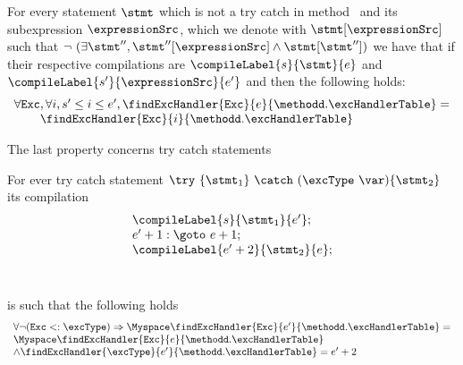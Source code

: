 \begin{compProp9}\label{compile:prop:compProp9}
  For every statement $\stmt$ which is not a try catch  in method \methodd \  and  its subexpression $\expressionSrc$, which we
 denote with $\stmt[\expressionSrc]$   
 such that $\neg \ ( \exists \stmt'', \stmt''[\expressionSrc] \wedge \stmt[\stmt'']  ) $ we have that 
if their respective compilations are  $\compileLabel{s}{\stmt}{e}$ and  $\compileLabel{s'}{\expressionSrc}{e'}$ and 
 then the following holds:
$$ \begin{array}{l}
          \forall \mbox{\rm\tt{Exc}}, \forall  i, s' \le i \le e' ,  \findExcHandler{\mbox{\rm\tt{Exc}} }{e}{\methodd.\excHandlerTable} = \\
	  \phantom{\forall \mbox{\rm\tt{Exc}} }\findExcHandler{\mbox{\rm\tt{Exc}} }{i}{\methodd.\excHandlerTable} 
   \end{array}
$$
\end{compProp9}

The last property concerns try catch statements
\begin{compProp10}\label{compile:prop:compProp10}
For ever try catch statement $ \try \ \{ \stmt_1 \} \ \catch \ (\excType \ \var )\{ \stmt_2 \}  $ 
its compilation $$
\begin{array}{l} 
\compileLabel{s}{\stmt_1}{e'}; \\
                       e' + 1: \goto \ e + 1; \\
		  
                       \compileLabel{e' + 2 }{\stmt_2}{e };\\
		       \\ \\

 \end{array}$$
is such that the following holds 
$$\begin{array}{l} \forall \neg ( \mbox{\rm{\texttt{Exc}}} <: \excType ) \Rightarrow
 \Myspace   \findExcHandler{\mbox{\rm\tt{Exc}} }{e'}{\methodd.\excHandlerTable} =\\ 
 \Myspace   \findExcHandler{\mbox{\rm\tt{Exc}} }{e}{\methodd.\excHandlerTable}  \\
 \wedge
  \findExcHandler{\excType }{e'}{\methodd.\excHandlerTable} = e'+2 \\ 
 \end{array} $$



\end{compProp10}


